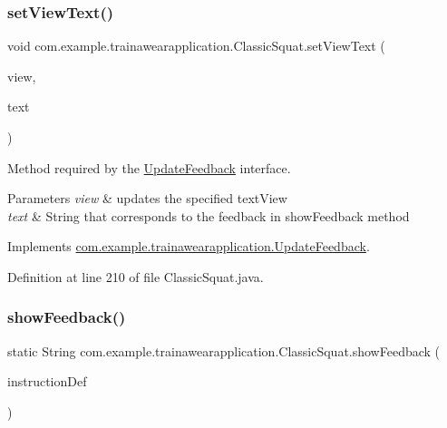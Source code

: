 \subsubsection{\texorpdfstring{setViewText()}{setViewText()}}
{\footnotesize\ttfamily void com.\+example.\+trainawearapplication.\+Classic\+Squat.\+set\+View\+Text (\begin{DoxyParamCaption}\item[{Text\+View}]{view,  }\item[{String}]{text }\end{DoxyParamCaption})}



Method required by the \mbox{\hyperlink{interfacecom_1_1example_1_1trainawearapplication_1_1_update_feedback}{Update\+Feedback}} interface. 


\begin{DoxyParams}{Parameters}
{\em view} & updates the specified text\+View \\
\hline
{\em text} & String that corresponds to the feedback in show\+Feedback method \\
\hline
\end{DoxyParams}


Implements \mbox{\hyperlink{interfacecom_1_1example_1_1trainawearapplication_1_1_update_feedback_a7a026880188b11aca6d8184d57e699e8}{com.\+example.\+trainawearapplication.\+Update\+Feedback}}.



Definition at line 210 of file Classic\+Squat.\+java.


\begin{DoxyCode}{0}

\end{DoxyCode}
\mbox{\label{classcom_1_1example_1_1trainawearapplication_1_1_classic_squat_a1904cfcfcc9d0e3f1256202a8f7ad33e}} 
\subsubsection{\texorpdfstring{showFeedback()}{showFeedback()}}
{\footnotesize\ttfamily static String com.\+example.\+trainawearapplication.\+Classic\+Squat.\+show\+Feedback (\begin{DoxyParamCaption}\item[{String}]{instruction\+Def }\end{DoxyParamCaption})\hspace{0.3cm}{\ttfamily [static]}}



